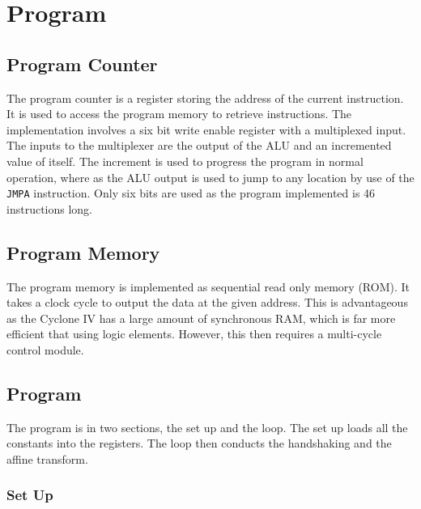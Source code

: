 
\section{Program}\label{sect:prog}

\subsection{Program Counter}
The program counter is a register storing the address of the current instruction.
It is used to access the program memory to retrieve instructions. 
The implementation involves a six bit write enable register with a multiplexed input. 
The inputs to the multiplexer are the output of the ALU and an incremented value of itself.
The increment is used to progress the program in normal operation, where as the ALU output is used to jump to any location by use of the \texttt{JMPA} instruction.
Only six bits are used as the program implemented is 46 instructions long. 

\subsection{Program Memory}
The program memory is implemented as sequential read only memory (ROM). 
It takes a clock cycle to output the data at the given address. 
This is advantageous as the Cyclone IV has a large amount of synchronous RAM, which is far more efficient that using logic elements.
However, this then requires a multi-cycle control module. 

\subsection{Program}

The program is in two sections, the set up and the loop. 
The set up loads all the constants into the registers. 
The loop then conducts the handshaking and the affine transform. 

\subsubsection{Set Up}

